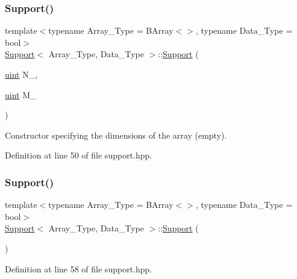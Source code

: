 \subsubsection{\texorpdfstring{Support()}{Support()}\hspace{0.1cm}{\footnotesize\ttfamily [2/3]}}
{\footnotesize\ttfamily template$<$typename Array\+\_\+\+Type = B\+Array$<$$>$, typename Data\+\_\+\+Type = bool$>$ \\
\hyperlink{class_support}{Support}$<$ Array\+\_\+\+Type, Data\+\_\+\+Type $>$\+::\hyperlink{class_support}{Support} (\begin{DoxyParamCaption}\item[{\hyperlink{typedefs_8hpp_a91ad9478d81a7aaf2593e8d9c3d06a14}{uint}}]{N\+\_\+,  }\item[{\hyperlink{typedefs_8hpp_a91ad9478d81a7aaf2593e8d9c3d06a14}{uint}}]{M\+\_\+ }\end{DoxyParamCaption})\hspace{0.3cm}{\ttfamily [inline]}}



Constructor specifying the dimensions of the array (empty). 



Definition at line 50 of file support.\+hpp.

\mbox{\label{class_support_a8366d26b4fcd122cd9139fdee92729a5}} 
\subsubsection{\texorpdfstring{Support()}{Support()}\hspace{0.1cm}{\footnotesize\ttfamily [3/3]}}
{\footnotesize\ttfamily template$<$typename Array\+\_\+\+Type = B\+Array$<$$>$, typename Data\+\_\+\+Type = bool$>$ \\
\hyperlink{class_support}{Support}$<$ Array\+\_\+\+Type, Data\+\_\+\+Type $>$\+::\hyperlink{class_support}{Support} (\begin{DoxyParamCaption}{ }\end{DoxyParamCaption})\hspace{0.3cm}{\ttfamily [inline]}}



Definition at line 58 of file support.\+hpp.

\mbox{\label{class_support_a03228371869980fa356b7b86871d94e8}} 
